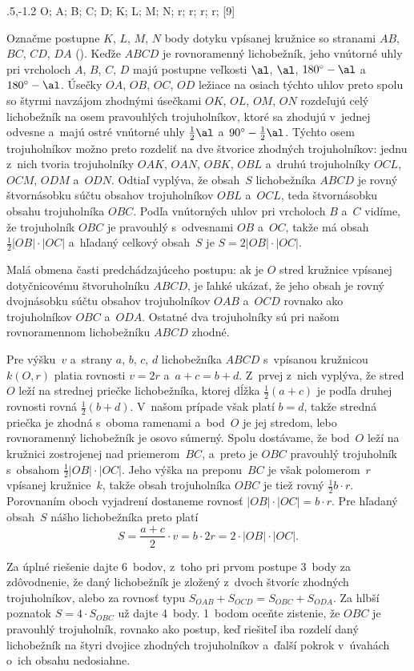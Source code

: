 {%
\fontplace
\rtpoint\xy.5,-1.2 O; \tpoint A; \tpoint B; \bpoint C; \bpoint D;
\tpoint K; \lBpoint L; \bpoint M; \rBpoint N;
\lpoint r; \tpoint r; \lpoint r; \tpoint r;
[9] \hfil\Obr

Označme postupne $K$, $L$, $M$, $N$ body dotyku vpísanej kružnice
so stranami $AB$, $BC$, $CD$, $DA$ (\obr). Keďže $ABCD$
je rovnoramenný lichobežník, jeho vnútorné uhly pri vrcholoch $A$,
$B$, $C$, $D$ majú postupne veľkosti $\al$, $\al$,
\inspicture{}
$180^{\circ}-\al$ a~$180^{\circ}-\al$. Úsečky $OA$, $OB$, $OC$,
$OD$ ležiace na osiach týchto uhlov preto spolu so štyrmi navzájom
zhodnými úsečkami $OK$, $OL$, $OM$, $ON$ rozdeľujú celý
lichobežník na osem pravouhlých trojuholníkov, ktoré sa zhodujú v~jednej
odvesne a~majú ostré vnútorné uhly $\frac12\al$ 
a~$90^{\circ}-\frac12\al$. Týchto osem trojuholníkov možno preto rozdeliť na
dve štvorice zhodných trojuholníkov: jednu z~nich tvoria trojuholníky $OAK$,
$OAN$, $OBK$, $OBL$ a~druhú trojuholníky $OCL$, $OCM$, $ODM$ a~$ODN$.
Odtiaľ vyplýva, že obsah~$S$ lichobežníka $ABCD$ je rovný
štvornásobku súčtu obsahov trojuholníkov $OBL$ a~$OCL$, teda štvornásobku
obsahu trojuholníka $OBC$. Podľa vnútorných uhlov pri vrcholoch $B$ a~$C$
vidíme, že trojuholník $OBC$ je pravouhlý s~odvesnami $OB$ a~$OC$, takže
má obsah $\frac12|OB|\cdot|OC|$ a~hľadaný celkový obsah~$S$ je $S=2|OB|\cdot|OC|$.

\poznamka
Malá obmena časti predchádzajúceho postupu: ak je $O$ stred kružnice
vpísanej dotyčnicovému štvoruholníku $ABCD$, je ľahké ukázať, že jeho
obsah je rovný dvojnásobku súčtu obsahov trojuholníkov $OAB$ a~$OCD$
rovnako ako trojuholníkov $OBC$ a~$ODA$. Ostatné dva trojuholníky
sú pri našom rovnoramennom lichobežníku $ABCD$ zhodné.

\ineriesenie %
Pre výšku~$v$ a~strany $a$, $b$, $c$, $d$ lichobežníka $ABCD$
s~vpísanou kružnicou $k(O,r)$ platia rovnosti $v=2r$ a~$a+c=b+d$.
Z~prvej z~nich vyplýva, že stred~$O$ leží na strednej priečke
lichobežníka, ktorej dĺžka $\frac12(a+c)$ je podľa druhej rovnosti
rovná $\frac12(b+d)$. V~našom prípade však platí $b=d$,
takže stredná priečka je zhodná s~oboma ramenami a~bod~$O$ je
jej stredom, lebo rovnoramenný lichobežník je osovo súmerný.
Spolu dostávame, že bod~$O$ leží na kružnici zostrojenej
nad priemerom~$BC$, a~preto je $OBC$ pravouhlý trojuholník s~obsahom
$\frac12|OB|\cdot|OC|$. Jeho výška na preponu~$BC$ je však
polomerom~$r$ vpísanej kružnice~$k$, takže obsah trojuholníka $OBC$ je
tiež rovný $\frac12b\cdot r$. Porovnaním oboch vyjadrení
dostaneme rovnosť $|OB|\cdot|OC|=b\cdot r$. Pre hľadaný obsah~$S$
nášho lichobežníka preto platí
$$
S=\frac{a+c}{2}\cdot v=b\cdot 2r=2\cdot|OB|\cdot|OC|.
$$

\nobreak\medskip\petit\noindent
Za úplné riešenie dajte 6~bodov, z~toho
pri prvom postupe
3~body za zdôvodnenie, že daný lichobežník
je zložený z~dvoch štvoríc zhodných trojuholníkov, alebo za rovnosť
typu $S_{OAB}+S_{OCD}=S_{OBC}+S_{ODA}$. Za hlbší poznatok
$S=4\cdot S_{OBC}$ už dajte 4~body.
1~bodom oceňte zistenie, že $OBC$ je pravouhlý trojuholník,
rovnako ako postup, keď
riešiteľ iba rozdelí daný lichobežník na štyri dvojice
zhodných trojuholníkov a~ďalší pokrok v~úvahách o~ich obsahu
nedosiahne.
\endpetit
\bigbreak
}

